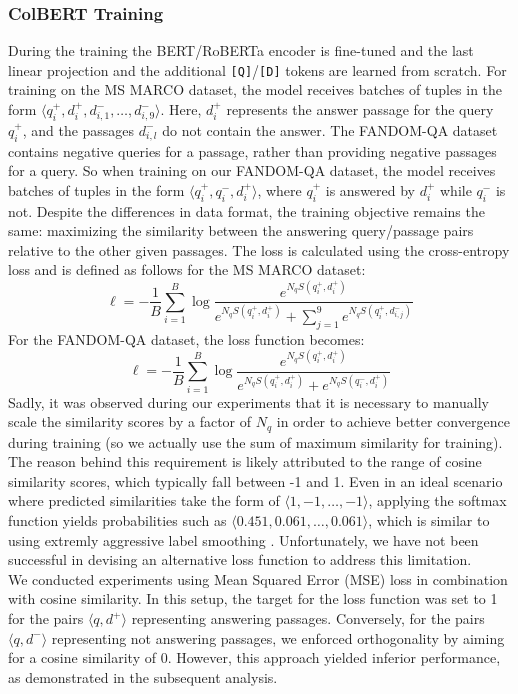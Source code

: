 \documentclass[11pt]{article}
\begin{document}
\subsubsection{ColBERT Training}
During the training the BERT/RoBERTa encoder is fine-tuned and the last linear projection and the additional \texttt{[Q]}/\texttt{[D]} tokens are learned from scratch. For training on the MS MARCO dataset, the model receives batches of tuples in the form $\langle q_i^+, d_i^+, d_{i, 1}^-, \dots, d_{i, 9}^-\rangle$. Here, $d_i^+$ represents the answer passage for the query $q_i^+$, and the passages $d_{i, l}^-$ do not contain the answer. 
The FANDOM-QA dataset contains negative queries for a passage, rather than providing negative passages for a query.
So when training on our FANDOM-QA dataset, the model receives batches of tuples in the form $\langle q_i^+, q_i^-, d_i^+\rangle$, where $q_i^+$ is answered by $d_i^+$ while $q_i^-$ is not. Despite the differences in data format, the training objective remains the same: maximizing the similarity between the answering query/passage pairs relative to the other given passages. The loss is calculated using the cross-entropy loss and is defined as follows for the MS MARCO dataset:
$$
\ell = -\frac{1}{B} \sum_{i=1}^{B} \log \frac{e^{N_q S(q_i^+, d_i^+)}}{e^{N_q S(q_i^+, d_i^+)} + \sum_{j=1}^{9}{e^{N_q S(q_i^+, d_{i, j}^-)}}}
$$
For the FANDOM-QA dataset, the loss function becomes:
$$
\ell = -\frac{1}{B} \sum_{i=1}^{B} \log \frac{e^{N_q S(q_i^+, d_i^+)}}{e^{N_q S(q_i^+, d_i^+)} + e^{N_q S(q_i^-, d_i^+)}}
$$
Sadly, it was observed during our experiments that it is necessary to manually scale the similarity scores by a factor of $N_q$ in order to achieve better convergence during training (so we actually use the sum of maximum similarity for training). The reason behind this requirement is likely attributed to the range of cosine similarity scores, which typically fall between -1 and 1. Even in an ideal scenario where predicted similarities take the form of $\langle 1, -1, \dots, -1\rangle$, applying the softmax function yields probabilities such as $\langle 0.451, 0.061, \dots, 0.061\rangle$, which is similar to using extremly aggressive label smoothing \cite{szegedy2015rethinking}. Unfortunately, we have not been successful in devising an alternative loss function to address this limitation. \\
We conducted experiments using Mean Squared Error (MSE) loss in combination with cosine similarity. In this setup, the target for the loss function was set to 1 for the pairs $\langle q, d^+\rangle$ representing answering passages. Conversely, for the pairs $\langle q, d^-\rangle$ representing not answering passages, we enforced orthogonality by aiming for a cosine similarity of 0. However, this approach yielded inferior performance, as demonstrated in the subsequent analysis.
\end{document}
